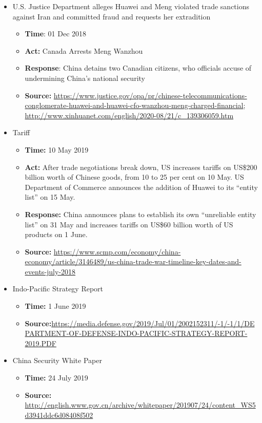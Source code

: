 \begin{itemize}
			\item U.S. Justice Department alleges Huawei and Meng violated trade sanctions against Iran and committed fraud and requests her extradition
				\begin{itemize}
				\item \textbf{Time}: 01 Dec 2018
				\item \textbf{Act:} Canada Arrests Meng Wanzhou
				\item \textbf{Response}: China detains two Canadian citizens, who officials accuse of undermining China’s national security
				\item	\textbf{Source:} \url{https://www.justice.gov/opa/pr/chinese-telecommunications-conglomerate-huawei-and-huawei-cfo-wanzhou-meng-charged-financial}; \url{http://www.xinhuanet.com/english/2020-08/21/c_139306059.htm}
				\end{itemize}
				
			\item Tariff
				\begin{itemize}
				\item \textbf{Time: } 10 May 2019
				\item \textbf{Act: }After trade negotiations break down, US increases tariffs on US\$200 billion worth of Chinese goods, from 10 to 25 per cent on 10 May. US Department of Commerce announces the addition of Huawei to its “entity list” on 15 May.
				\item \textbf{Response: }China announces plans to establish its own “unreliable entity list” on 31 May and increases tariffs on US\$60 billion worth of US products on 1 June.
				\item	\textbf{Source: }\url{https://www.scmp.com/economy/china-economy/article/3146489/us-china-trade-war-timeline-key-dates-and-events-july-2018}
				\end{itemize}
				
			\item Indo-Pacific Strategy Report
				\begin{itemize}
				\item \textbf{Time:} 1 June 2019
				\item \textbf{Source:}\url{https://media.defense.gov/2019/Jul/01/2002152311/-1/-1/1/DEPARTMENT-OF-DEFENSE-INDO-PACIFIC-STRATEGY-REPORT-2019.PDF}
				\end{itemize}
				
			\item China Security White Paper
				\begin{itemize}
				\item \textbf{Time:} 24 July 2019
				\item \textbf{Source:} \url{http://english.www.gov.cn/archive/whitepaper/201907/24/content_WS5d3941ddc6d08408f502}
				\end{itemize}
			

\end{itemize}
